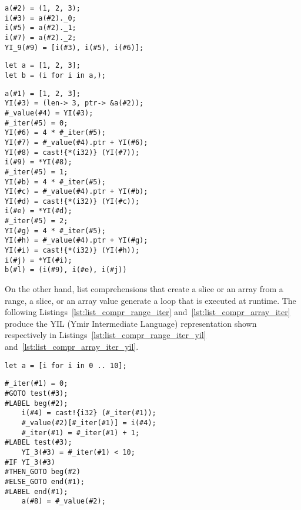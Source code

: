 \begin{lstlisting}[style=intermediateVerb, label=lst:list_compr_tuple_iter_yil, caption=YIL representation of Listing~\ref{lst:list_compr_tuple_iter}]
a(#2) = (1, 2, 3);
i(#3) = a(#2)._0;
i(#5) = a(#2)._1;
i(#7) = a(#2)._2;
YI_9(#9) = [i(#3), i(#5), i(#6)];
\end{lstlisting}

\begin{lstlisting}[style=coloredverbatim, label=lst:list_compr_tuple_iter, caption=List comprehension iterating over a tuple]
let a = [1, 2, 3];
let b = (i for i in a,);
\end{lstlisting}

\begin{lstlisting}[style=intermediateVerb, label=lst:list_compr_tuple_iter_yil, caption=YIL representation of Listing~\ref{lst:list_compr_tuple_iter}]
a(#1) = [1, 2, 3];
YI(#3) = (len-> 3, ptr-> &a(#2));
#_value(#4) = YI(#3);
#_iter(#5) = 0;
YI(#6) = 4 * #_iter(#5);
YI(#7) = #_value(#4).ptr + YI(#6);
YI(#8) = cast!{*(i32)} (YI(#7));
i(#9) = *YI(#8);
#_iter(#5) = 1;
YI(#b) = 4 * #_iter(#5);
YI(#c) = #_value(#4).ptr + YI(#b);
YI(#d) = cast!{*(i32)} (YI(#c));
i(#e) = *YI(#d);
#_iter(#5) = 2;
YI(#g) = 4 * #_iter(#5);
YI(#h) = #_value(#4).ptr + YI(#g);
YI(#i) = cast!{*(i32)} (YI(#h));
i(#j) = *YI(#i);
b(#l) = (i(#9), i(#e), i(#j))
\end{lstlisting}

On the other hand, list comprehensions that create a slice or an array from a
range, a slice, or an array value generate a loop that is executed at runtime.
The following Listings~\ref{lst:list_compr_range_iter}
and~\ref{lst:list_compr_array_iter} produce the YIL (Ymir Intermediate Language)
representation shown respectively in
Listings~\ref{lst:list_compr_range_iter_yil}
and~\ref{lst:list_compr_array_iter_yil}.

\begin{lstlisting}[style=coloredverbatim, label=lst:list_compr_range_iter, caption=List comprehension iterating over a range]
let a = [i for i in 0 .. 10];
\end{lstlisting}

\begin{lstlisting}[style=intermediateVerb, label=lst:list_compr_range_iter_yil, caption=YIL representation of Listing~\ref{lst:list_compr_range_iter}]
    #_iter(#1) = 0;
#GOTO test(#3);
#LABEL beg(#2);
    i(#4) = cast!{i32} (#_iter(#1));
    #_value(#2)[#_iter(#1)] = i(#4);
    #_iter(#1) = #_iter(#1) + 1;
#LABEL test(#3);
    YI_3(#3) = #_iter(#1) < 10;
#IF YI_3(#3)
#THEN_GOTO beg(#2)
#ELSE_GOTO end(#1);
#LABEL end(#1);
    a(#8) = #_value(#2);
\end{lstlisting}

